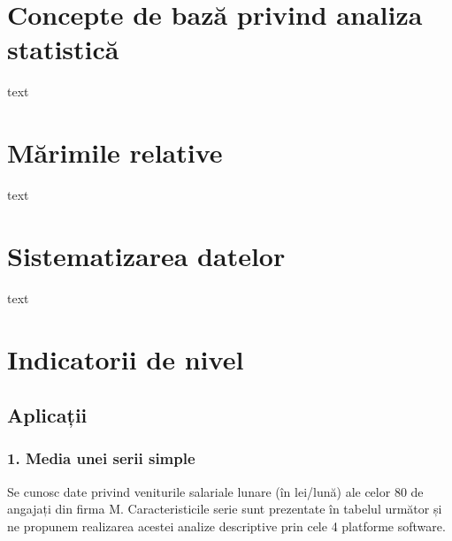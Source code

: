 \documentclass[
  11pt,
  b5paper,
  nottoc]{book}
\begin{document}
\section{Concepte de bază privind analiza
statistică}\label{concepte-de-bazux103-privind-analiza-statisticux103}

text

\section{Mărimile relative}\label{mux103rimile-relative}

text

\section{Sistematizarea datelor}\label{sistematizarea-datelor}

text

\section{Indicatorii de nivel}\label{indicatorii-de-nivel}

\subsection{Aplicații}\label{aplicaux21bii}

\subsubsection{1. Media unei serii
simple}\label{media-unei-serii-simple}

Se cunosc date privind veniturile salariale lunare (în lei/lună) ale
celor 80 de angajați din firma M. Caracteristicile serie sunt prezentate
în tabelul următor și ne propunem realizarea acestei analize descriptive
prin cele 4 platforme software.
\end{document}
